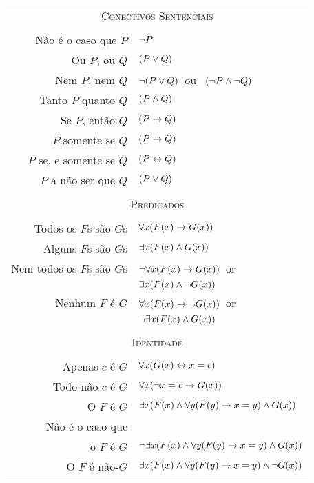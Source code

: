 \begin{center}
\begin{tabular*}{\textwidth}{rl}
\multicolumn{2}{c}{\textsc{Conectivos Sentenciais}}\\ \\
Não é o caso que $P$ & $\neg P$\\
Ou $P$, ou $Q$ & $(P \vee Q)$\\
Nem $P$, nem $Q$ & $\neg(P \vee Q)$\ ou \ $(\neg P \wedge \neg Q)$\\
Tanto $P$ quanto $Q$ & $(P \wedge Q)$\\
Se $P$, então $Q$ & $(P \rightarrow Q)$\\
$P$ somente se $Q$ & $(P \rightarrow Q)$\\
$P$ se, e somente se $Q$ & $(P \leftrightarrow Q)$\\
$P$ a não ser que $Q$ & $(P \vee Q)$\\
\\
\multicolumn{2}{c}{\label{SymbolizingPredicates}\textsc{Predicados}}\\ \\
Todos os $F$s são $G$s & $\forall x(\mathord{F}(x) \rightarrow \mathord{G}(x))$\\
Alguns $F$s são $G$s & $\exists x(\mathord{F}(x) \wedge \mathord{G}(x))$\\
Nem todos os $F$s são $G$s & $\neg\forall x(\mathord{F}(x) \rightarrow \mathord{G}(x))$\ or\\
& $\exists x(\mathord{F}(x) \wedge \neg \mathord{G}(x))$\\
Nenhum $F$ é $G$ & $\forall x(\mathord{F}(x) \rightarrow\neg \mathord{G}(x))$\ or\\
& $\neg\exists x(\mathord{F}(x) \wedge \mathord{G}(x))$\\
\\
\multicolumn{2}{c}{\textsc{Identidade}}\\ \\
Apenas $c$ é $G$ & $\forall x(\mathord{G}(x) \leftrightarrow x=c)$\\
Todo não $c$ é $G$ & $\forall x(\neg x = c \rightarrow \mathord{G}(x) )$\\
O $F$ é $G$ & $\exists x(\mathord{F}(x) \wedge \forall y(\mathord{F}(y) \rightarrow x=y) \wedge \mathord{G}(x) )$\\
Não é o caso que\\
 o $F$ é $G$ & $\neg\exists x(\mathord{F}(x) \wedge \forall y(\mathord{F}(y) \rightarrow x=y) \wedge \mathord{G}(x) )$\\
O $F$ é não-$G$ & $\exists x(\mathord{F}(x) \wedge \forall y(\mathord{F}(y) \rightarrow x=y) \wedge \neg \mathord{G}(x) )$
\end{tabular*}
\end{center}




